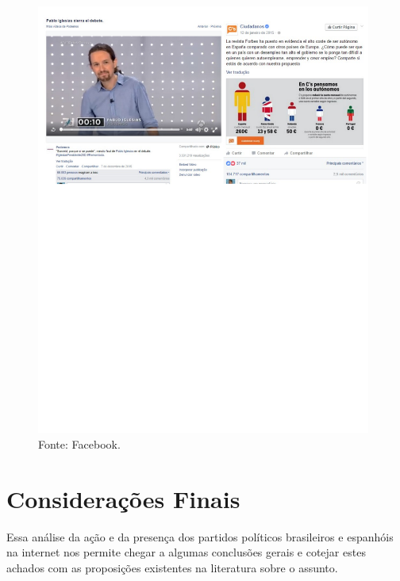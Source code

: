 \begin{figure}[!ht]
\centering
 \includegraphics[width=110mm]{./imgs/fig1.pdf}
\caption{Fonte: Facebook.}
\end{figure}


\section{Considerações Finais}

Essa análise da ação e da presença dos partidos políticos brasileiros e
espanhóis na internet nos permite chegar a algumas conclusões gerais e
cotejar estes achados com as proposições existentes na literatura sobre
o assunto.


